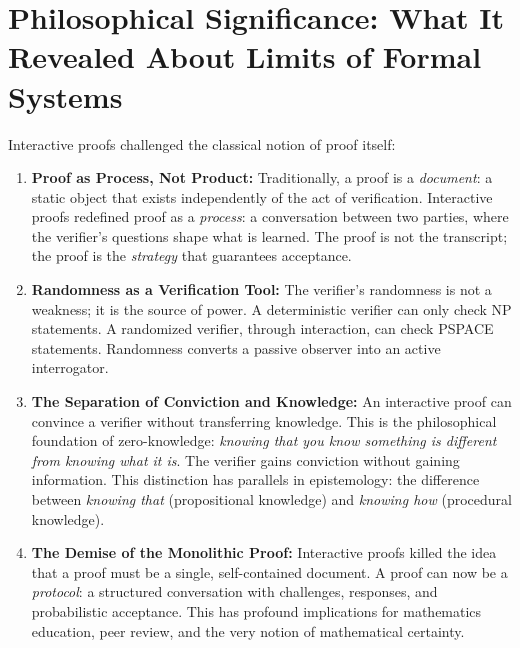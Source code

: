 \section{Philosophical Significance: What It Revealed About Limits of Formal Systems}
\label{sec:ip:philosophical}

Interactive proofs challenged the classical notion of proof itself:

\begin{enumerate}
\item \textbf{Proof as Process, Not Product:} Traditionally, a proof is a \emph{document}: a static object that exists independently of the act of verification. Interactive proofs redefined proof as a \emph{process}: a conversation between two parties, where the verifier's questions shape what is learned. The proof is not the transcript; the proof is the \emph{strategy} that guarantees acceptance.

\item \textbf{Randomness as a Verification Tool:} The verifier's randomness is not a weakness; it is the source of power. A deterministic verifier can only check NP statements. A randomized verifier, through interaction, can check PSPACE statements. Randomness converts a passive observer into an active interrogator.

\item \textbf{The Separation of Conviction and Knowledge:} An interactive proof can convince a verifier without transferring knowledge. This is the philosophical foundation of zero-knowledge: \emph{knowing that you know something is different from knowing what it is}. The verifier gains conviction without gaining information. This distinction has parallels in epistemology: the difference between \emph{knowing that} (propositional knowledge) and \emph{knowing how} (procedural knowledge).

\item \textbf{The Demise of the Monolithic Proof:} Interactive proofs killed the idea that a proof must be a single, self-contained document. A proof can now be a \emph{protocol}: a structured conversation with challenges, responses, and probabilistic acceptance. This has profound implications for mathematics education, peer review, and the very notion of mathematical certainty.
\end{enumerate}

